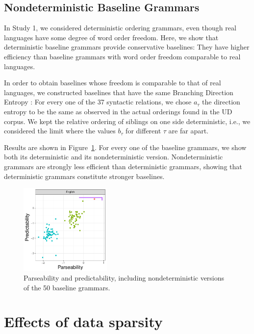 \documentclass[10pt,twoside,lineno]{article}
\begin{document}
\subsection{Nondeterministic Baseline Grammars}

In Study 1, we considered deterministic ordering grammars, even though real languages have some degree of word order freedom.
Here, we show that deterministic baseline grammars provide conservative baselines: They have higher efficiency than baseline grammars with word order freedom comparable to real languages.


In order to obtain baselines whose freedom is comparable to that of real languages, we constructed baselines that have the same Branching Direction Entropy \cite{futrell2015quantifying}:
For every one of the 37 syntactic relations, we chose $a_\tau$ the direction entropy to be the same as observed in the actual orderings found in the UD corpus.
We kept the relative ordering of siblings on one side deterministic, i.e., we considered the limit where the values $b_\tau$ for different $\tau$ are far apart.

Results are shown in Figure~\ref{fig:nondeterministic-english}.
For every one of the baseline grammars, we show both its deterministic and its nondeterministic version.
Nondeterministic grammars are strongly less efficient than deterministic grammars, showing that deterministic grammars constitute stronger baselines.

\begin{figure}
	\centering
	\includegraphics[width=0.4\textwidth]{../results/plane/nondeterministic/pareto-plane-perLanguage-nondeterministic-mle.pdf}
	\caption{Parseability and predictability, including nondeterministic versions of the 50 baseline grammars.}\label{fig:nondeterministic-english}
\end{figure}






\section{Effects of data sparsity}
\end{document}
